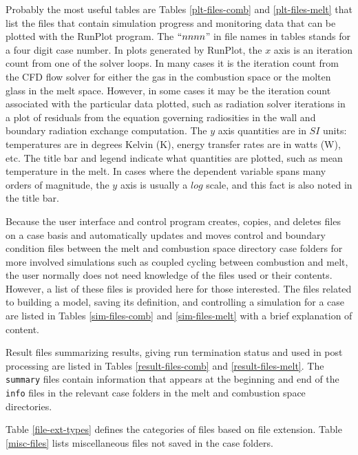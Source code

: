 \documentclass[twoside,12pt]{article}
\newcommand{\sub}[1]{\textsf{#1}}
\newcommand{\file}[1]{\texttt{#1}}
\numberwithin{equation}{section}
\begin{document}
Probably the most useful tables are Tables \ref{plt-files-comb} and \ref{plt-files-melt} that list the files that contain simulation progress and monitoring data that can be plotted with the \sub{RunPlot} program. The $``nnnn$'' in file names in tables stands for a four digit case number. In plots generated by \sub{RunPlot}, the $x$ axis is an iteration count from one of the solver loops. In many cases it is the iteration count from the CFD flow solver for either the gas in the combustion space or the molten glass in the melt space. However, in some cases it may be the iteration count associated with the particular data plotted, such as radiation solver iterations in a plot of residuals from the equation governing radiosities in the wall and boundary radiation exchange computation. The $y$ axis quantities are in $SI$ units: temperatures are in degrees Kelvin (K), energy transfer rates are in watts (W), etc. The title bar and legend indicate what quantities are plotted, such as mean temperature in the melt. In cases where the dependent variable spans many orders of magnitude, the $y$ axis is usually a $log$ scale, and this fact is also noted in the title bar.  

Because the user interface and control program creates, copies, and deletes files on a case basis and automatically updates and moves control and boundary condition files between the melt and combustion space directory case folders for more involved simulations such as coupled cycling between combustion and melt, the user normally does not need knowledge of the files used or their contents. However, a list of these files is provided here for those interested. The files related to building a model, saving its definition, and controlling a simulation for a case are listed in Tables \ref{sim-files-comb} and \ref{sim-files-melt} with a brief explanation of content.

Result files summarizing results, giving run termination status and used in post processing are listed in Tables \ref{result-files-comb} and \ref{result-files-melt}. The \file{summary} files contain information that appears at the beginning and end of the \file{info} files in the relevant case folders in the melt and combustion space directories. 


Table \ref{file-ext-types} defines the categories of files based on file extension. Table \ref{misc-files} lists miscellaneous files not saved in the case folders.
\end{document}
